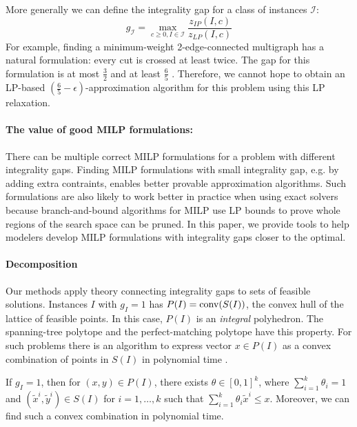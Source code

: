 More generally we can define the integrality gap for a class of instances $\mathcal{I}$:%
\begin{equation}
g_\mathcal{I} = \max_{c\geq 0 , I\in\mathcal{I}}\frac{z_{IP}(I,c)}{z_{LP}(I,c)}
\end{equation}
For example, finding a  minimum-weight 2-edge-connected multigraph has a natural formulation: every cut is crossed at least twice.  The gap for this formulation is at most $\frac{3}{2}$ \cite{Wolsey1980} and at least $\frac{6}{5}$ \cite{carr-ravi}. Therefore, we cannot hope to obtain an LP-based $(\frac{6}{5}-\epsilon)$-approximation algorithm for this problem using this LP relaxation.

\paragraph{The value of good MILP formulations:} There can be multiple correct MILP formulations for a problem with different integrality gaps. Finding MILP formulations with small integrality gap, e.g. by adding extra contraints, enables better provable approximation algorithms.  Such formulations are also likely to work better in practice when using exact solvers because branch-and-bound algorithms for MILP use LP bounds to prove whole regions of the search space can be pruned. In this paper, we provide tools to help modelers develop MILP formulations with integrality gaps closer to the optimal.

\paragraph{Decomposition} Our methods apply theory connecting integrality gaps to sets of feasible solutions. Instances $I$ with  $g_I=1$ has $P(I)=\operatorname{conv}(S(I))$, the convex hull of the lattice of feasible points. In this case, $P(I)$ is an \textit{integral} polyhedron. The spanning-tree polytope and the perfect-matching polytope \cite{schrijver} have this property. For such problems there is an algorithm to express vector $x\in P(I)$ as a convex combination of points in $S(I)$ in polynomial time \cite{cons-cara}.
\begin{proposition}\label{cara}
	If $g_I=1$, then for $(x,y)\in P(I)$, there exists $\theta \in [0,1]^k$, where $\sum_{i=1}^{k}\theta_i =1$ and $(\tilde{x}^i,\tilde{y}^i)\in S(I)$ for $i=1,\ldots,k$ such that $\sum_{i=1}^{k}\theta_i \tilde{x}^i\leq x$. Moreover, we can find such a convex combination in polynomial time.
\end{proposition}

